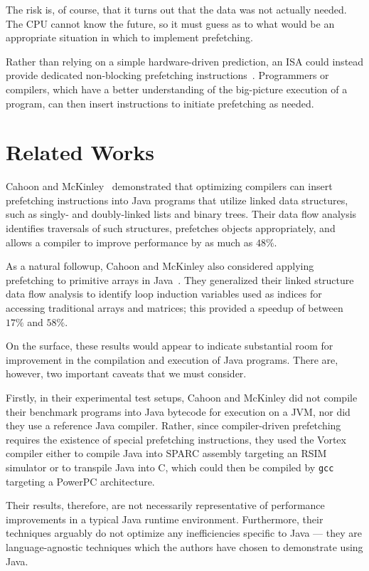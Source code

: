 \documentclass[journal]{IEEEtran}
\begin{document}
The risk is, of course, that it turns out that the data was not actually needed. The CPU cannot know the future, so it must guess as to what would be an appropriate situation in which to implement prefetching.

Rather than relying on a simple hardware-driven prediction, an ISA could instead provide dedicated non-blocking prefetching instructions~\cite{callahan}. Programmers or compilers, which have a better understanding of the big-picture execution of a program, can then insert instructions to initiate prefetching as needed.


\section{Related Works}

Cahoon and McKinley~\cite{cahoon2001} demonstrated that optimizing compilers can insert prefetching instructions into Java programs that utilize linked data structures, such as singly- and doubly-linked lists and binary trees. Their data flow analysis identifies traversals of such structures, prefetches objects appropriately, and allows a compiler to improve performance by as much as $48\%$.

As a natural followup, Cahoon and McKinley also considered applying prefetching to primitive arrays in Java~\cite{cahoon2002}. They generalized their linked structure data flow analysis to identify loop induction variables used as indices for accessing traditional arrays and matrices; this provided a speedup of between $17\%$ and $58\%$.

On the surface, these results would appear to indicate substantial room for improvement in the compilation and execution of Java programs. There are, however, two important caveats that we must consider.

Firstly, in their experimental test setups, Cahoon and McKinley did not compile their benchmark programs into Java bytecode for execution on a JVM, nor did they use a reference Java compiler. Rather, since compiler-driven prefetching requires the existence of special prefetching instructions, they used the Vortex compiler either to compile Java into SPARC assembly targeting an RSIM simulator or to transpile Java into C, which could then be compiled by \texttt{gcc} targeting a PowerPC architecture.

Their results, therefore, are not necessarily representative of performance improvements in a typical Java runtime environment. Furthermore, their techniques arguably do not optimize any inefficiencies specific to Java --- they are language-agnostic techniques which the authors have chosen to demonstrate using Java.
\end{document}
